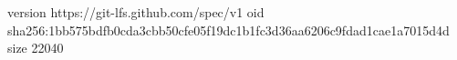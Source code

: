 version https://git-lfs.github.com/spec/v1
oid sha256:1bb575bdfb0cda3cbb50cfe05f19dc1b1fc3d36aa6206c9fdad1cae1a7015d4d
size 22040
